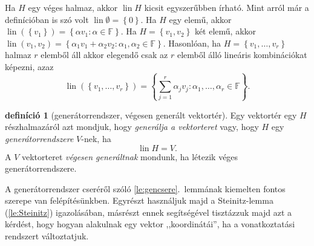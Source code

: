 \documentclass[a4paper, showtrims]{memoir}
\theoremstyle{plain}
\theoremstyle{remark}
\theoremstyle{definition}
\newtheorem{definition}[proposition]{definíció}
\DeclareMathOperator{\lin}{lin}
\begin{document}
Ha $H$ egy véges halmaz, akkor $\lin H$ kicsit egyszerűbben írható.
Mint arról már a definícióban is szó volt $\lin \emptyset=\left\{ 0 \right\}$.
Ha $H$ egy elemű, akkor $\lin (\left\{ v_1 \right\})=\left\{ \alpha v_1:\alpha\in\mathbb{F} \right\}$.
Ha $H=\left\{ v_1,v_2 \right\}$ két elemű, akkor
$\lin({v_1,v_2})=\left\{ \alpha_1v_1+\alpha_2v_2:\alpha_1,\alpha_2\in\mathbb{F} \right\}$.
Hasonlóan, ha $H=\left\{ v_1,\ldots,v_r \right\}$ halmaz $r$ elemből áll akkor elegendő csak az $r$ elemből álló lineáris kombinációkat képezni, azaz
\[
	\lin \left( \left\{ v_1,\ldots,v_r \right\} \right)
	=
	\left\{ \sum_{j=1}^r\alpha_jv_j:\alpha_1,\ldots,\alpha_r\in\mathbb{F} \right\}.
\]
\begin{definition}[generátorrendszer, végesen generált vektortér]
	Egy vektortér egy $H$ részhalmazáról azt mondjuk, hogy \emph{generálja a vektorteret}
	vagy, hogy $H$ egy \emph{generátorrendszere} $V$-nek, ha
	\[
		\lin H=V.
	\]
	A $V$ vektorteret \emph{végesen generáltnak} mondunk, ha létezik véges generátorrendszere.
\end{definition}

A generátorrendszer cseréről szóló \ref{le:gencsere}.~lemmának kiemelten fontos szerepe van felépítésünkben.
Egyrészt használjuk majd a Steinitz-lemma (\ref{le:Steinitz}) igazolásában,
másrészt ennek segítségével tisztázzuk majd azt a kérdést,
hogy hogyan alakulnak egy vektor ,,koordinátái'', ha a vonatkoztatási rendszert változtatjuk.
\end{document}
